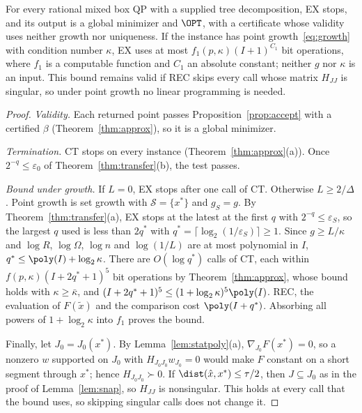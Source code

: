 \begin{theorem}\label{thm:exact}
For every rational mixed box QP with a supplied tree decomposition, EX
stops, and its output is a global minimizer and $\OPT$, with a certificate
whose validity uses neither growth nor uniqueness. If the instance has point
growth~\eqref{eq:growth} with condition number $\kappa$, EX uses at most
$f_1(p,\kappa)(I+1)^{C_1}$ bit operations, where $f_1$ is a computable
function and $C_1$ an absolute constant; neither $g$ nor $\kappa$ is an
input. This bound remains valid if REC skips every call whose matrix $H_{JJ}$
is singular, so under point growth no linear programming is needed.
\end{theorem}

\begin{proof}
\emph{Validity.} Each returned point passes Proposition~\ref{prop:accept}
with a certified $\beta$ (Theorem~\ref{thm:approx}), so it is a global
minimizer.

\emph{Termination.} CT stops on every instance
(Theorem~\ref{thm:approx}(a)). Once $2^{-q}\le\varepsilon_0$ of
Theorem~\ref{thm:transfer}(b), the test passes.

\emph{Bound under growth.} If $L=0$, EX stops after one call of CT. Otherwise
$L\ge2/\Delta$. Point growth is set growth with $\mathcal S=\{x^*\}$ and
$g_S=g$. By Theorem~\ref{thm:transfer}(a), EX stops at the latest at the first
$q$ with $2^{-q}\le\varepsilon_S$, so the largest $q$ used is less than $2q^*$
with $q^*=\lceil\log_2(1/\varepsilon_S)\rceil\ge1$. Since $g\ge L/\kappa$ and
$\log R$, $\log \Omega$, $\log n$ and $\log(1/L)$ are at most polynomial in
$I$, $q^*\le\poly(I)+\log_2\kappa$. There are $O(\log q^*)$ calls of CT, each
within $f(p,\kappa)(I+2q^*+1)^5$ bit operations by Theorem~\ref{thm:approx},
whose bound holds with $\kappa\ge\bar\kappa$, and
$(I+2q^*+1)^5\le(1+\log_2\kappa)^5\poly(I)$. REC, the evaluation of
$F(\tilde x)$ and the comparison cost $\poly(I+q^*)$. Absorbing all powers
of $1+\log_2\kappa$ into $f_1$ proves the bound.

Finally, let $J_0=J_0(x^*)$. By Lemma~\ref{lem:statpoly}(a),
$\nabla_{J_0}F(x^*)=0$, so a nonzero $w$ supported on $J_0$ with
$H_{J_0J_0}w_{J_0}=0$ would make $F$ constant on a short segment through
$x^*$; hence $H_{J_0J_0}\succ0$. If $\dist(\hat x,x^*)\le\tau/2$, then
$J\subseteq J_0$ as in the proof of Lemma~\ref{lem:snap}, so $H_{JJ}$ is
nonsingular. This holds at every call that the bound uses, so skipping
singular calls does not change it.
\end{proof}

